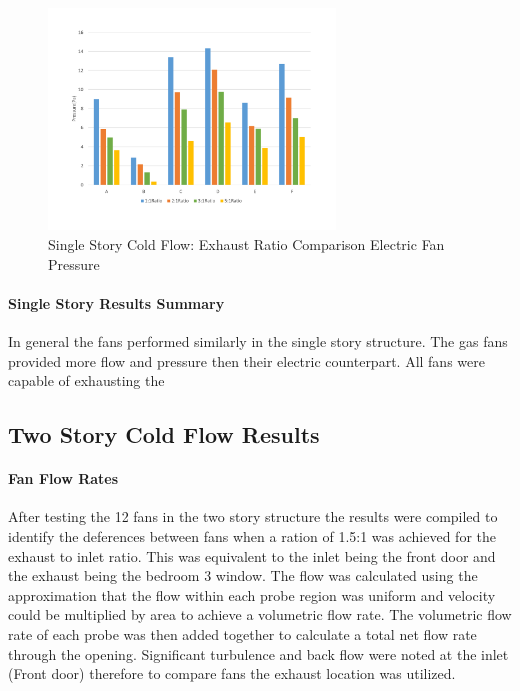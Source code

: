 \documentclass{article}
\begin{document}
	\begin{figure} [H]
		\centering
		\includegraphics[width=3in]{0_Images/ColdFlow/Single_Story/Ratio_Pressure_Dining_Ele.pdf}
		\caption{Single Story Cold Flow: Exhaust Ratio Comparison Electric Fan Pressure}
		\label{fig:Ratio_Pressure_ele}
	\end{figure}

\paragraph{Single Story Results Summary} \mbox{}

In general the fans performed similarly in the single story structure. The gas fans provided more flow and pressure then their electric counterpart. All fans were capable of exhausting the 

\subsection{Two Story Cold Flow Results}

\paragraph{Fan Flow Rates} \mbox{}

After testing the 12 fans in the two story structure the results were compiled to identify the deferences between fans when a ration of 1.5:1 was achieved for the exhaust to inlet ratio. This was equivalent to the inlet being the front door and the exhaust being the bedroom 3 window.  The flow was calculated using the approximation that the flow within each probe region was uniform and velocity could be multiplied by area to achieve a volumetric flow rate. The volumetric flow rate of each probe was then added together to calculate a total net flow rate through the opening. Significant turbulence and back flow were noted at the inlet (Front door) therefore to compare fans the exhaust location was utilized. 
\end{document}
